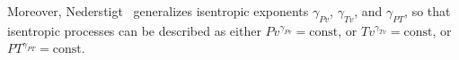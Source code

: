     Moreover,  Nederstigt~\cite{2017-NederstigtP-TUDelft}   generalizes   isentropic   exponents
    $\gamma_{Pv}$, $\gamma_{Tv}$,  and  $\gamma_{PT}$,  so  that  isentropic  processes  can  be
    described as either $Pv^{\gamma_{Pv}} = \mbox{const}$, or $Tv^{\gamma_{Tv}} = \mbox{const}$,
    or $PT^{\gamma_{PT}} = \mbox{const}$.


